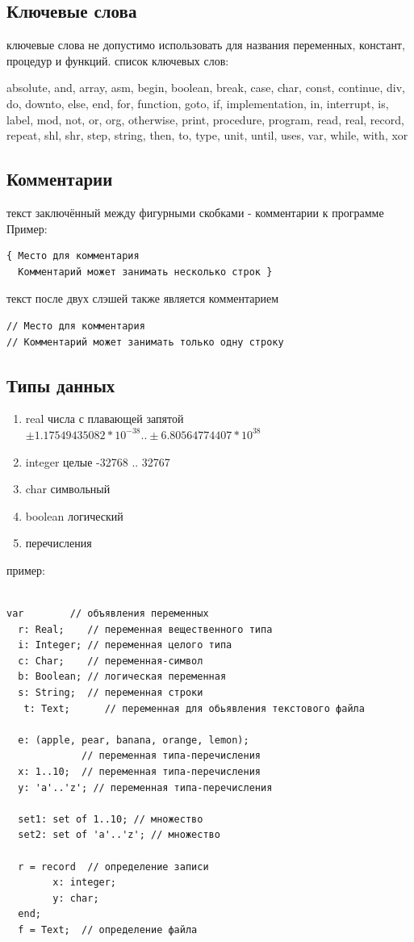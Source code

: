\documentclass[unicode, 12pt, a4paper,oneside,fleqn]{article}
\begin{document}
\subsection{Ключевые слова}
ключевые слова не допустимо использовать для названия переменных,
констант, процедур и функций.
список ключевых слов:

absolute, and, array, asm, begin, boolean, break, case, char, const, continue, div, do, downto, else, end, for, function, goto, if, implementation, in, interrupt, is, label, mod, not, or, org, otherwise, print, procedure, program, read, real, record, repeat, shl, shr, step, string, then, to, type, unit, until, uses, var, while, with, xor

\subsection{Комментарии}
текст заключённый между фигурными скобками - комментарии к программе 
Пример: 
\begin{verbatim}
{ Место для комментария
  Комментарий может занимать несколько строк }
\end{verbatim}

текст после двух слэшей также является комментарием
\begin{verbatim}
// Место для комментария
// Комментарий может занимать только одну строку
\end{verbatim}




\subsection{Типы данных}
\begin{enumerate}
\item real числа с плавающей запятой \\
 $±1.17549435082 * 10^{-38} .. ±6.80564774407 * 10^{38}$

\item integer целые -32768 .. 32767

\item char символьный
\item boolean логический
\item перечисления
\end{enumerate}
пример:
\begin{verbatim}

var        // объявления переменных
  r: Real;    // переменная вещественного типа
  i: Integer; // переменная целого типа
  c: Char;    // переменная-символ
  b: Boolean; // логическая переменная
  s: String;  // переменная строки
   t: Text;      // переменная для обьявления текстового файла

  e: (apple, pear, banana, orange, lemon); 
             // переменная типа-перечисления
  x: 1..10;  // переменная типа-перечисления
  y: 'a'..'z'; // переменная типа-перечисления

  set1: set of 1..10; // множество
  set2: set of 'a'..'z'; // множество

  r = record  // определение записи
        x: integer;
        y: char;
  end;
  f = Text;  // определение файла

\end{verbatim}
\end{document}
